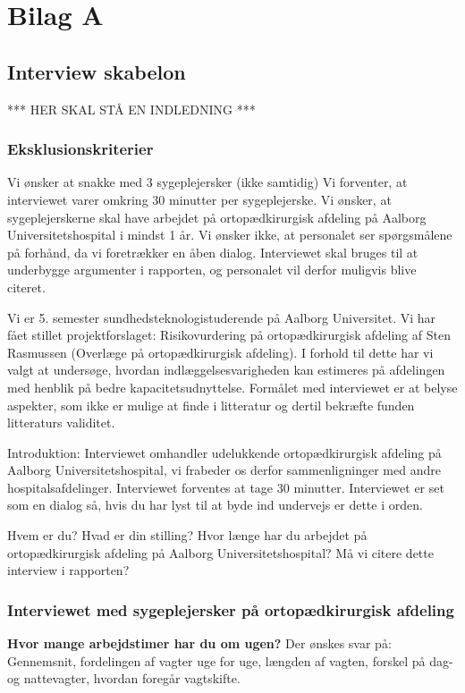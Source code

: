 \chapter{Bilag A}

\section{Interview skabelon} \label{bilagA}
*** HER SKAL STÅ EN INDLEDNING ***
\subsection{Eksklusionskriterier}
Vi ønsker at snakke med 3 sygeplejersker (ikke samtidig)
Vi forventer, at interviewet varer omkring 30 minutter per sygeplejerske.
Vi ønsker, at sygeplejerskerne skal have arbejdet på ortopædkirurgisk afdeling på Aalborg Universitetshospital i mindst 1 år.
Vi ønsker ikke, at personalet ser spørgsmålene på forhånd, da vi foretrækker en åben dialog.
Interviewet skal bruges til at underbygge argumenter i rapporten, og personalet vil derfor muligvis blive citeret.


Vi er 5. semester sundhedsteknologistuderende på Aalborg Universitet. Vi har fået stillet projektforslaget: Risikovurdering på ortopædkirurgisk afdeling af Sten Rasmussen (Overlæge på ortopædkirurgisk afdeling). I forhold til dette har vi valgt at undersøge, hvordan indlæggelsesvarigheden kan estimeres på afdelingen med henblik på bedre kapacitetsudnyttelse. Formålet med interviewet er at belyse aspekter, som ikke er mulige at finde i litteratur og dertil bekræfte funden litteraturs validitet.  


Introduktion:
Interviewet omhandler udelukkende ortopædkirurgisk afdeling på Aalborg Universitetshospital, vi frabeder os derfor sammenligninger med andre hospitalsafdelinger. Interviewet forventes at tage 30 minutter. Interviewet er set som en dialog så, hvis du har lyst til at byde ind undervejs er dette i orden.


Hvem er du?
Hvad er din stilling?
Hvor længe har du arbejdet på ortopædkirurgisk afdeling på Aalborg Universitetshospital?
Må vi citere dette interview i rapporten?

\subsection{Interviewet med sygeplejersker på ortopædkirurgisk afdeling}
\textbf{Hvor mange arbejdstimer har du om ugen?}
Der ønskes svar på: Gennemsnit, fordelingen af vagter uge for uge, længden af vagten, forskel på dag- og nattevagter, hvordan foregår vagtskifte. 

